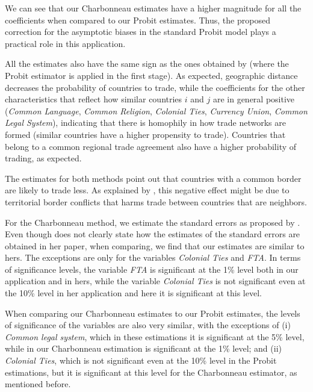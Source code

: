 We can see that our Charbonneau estimates have a higher magnitude for all the coefficients when compared to our Probit estimates. Thus, the proposed correction for the asymptotic biases in the standard Probit model plays a practical role in this application.

All the estimates also have the same sign as the ones obtained by \cite{helpman2008estimating} (where the Probit estimator is applied in the first stage). As expected, geographic distance decreases the probability of countries to trade, while the coefficients for the other characteristics that reflect how similar countries $i$ and $j$ are in general positive (\textit{Common Language}, \textit{Common Religion}, \textit{Colonial Ties}, \textit{Currency Union}, \textit{Common Legal System}), indicating that there is homophily in how trade networks are formed (similar countries have a higher propensity to trade). Countries that belong to a common regional trade agreement also have a higher probability of trading, as expected.

The estimates for both methods point out that countries with a common border are likely to trade less. As explained by \cite{helpman2008estimating}, this negative effect might be due to territorial border conflicts that harms trade between countries that are neighbors.

For the Charbonneau method, we estimate the standard errors as proposed by \cite{jochmans2018semiparametric}. Even though \cite{charbonneau2017multiple} does not clearly state how the estimates of the standard errors are obtained in her paper, when comparing, we find that our estimates are similar to hers. The exceptions are only for the variables \textit{Colonial Ties} and \textit{FTA}. In terms of significance levels, the variable \textit{FTA} is significant at the 1\% level both in our application and in hers, while the variable \textit{Colonial Ties} is not significant even at the 10\% level in her application and here it is significant at this level.

When comparing our Charbonneau estimates to our Probit estimates, the levels of significance of the variables are also very similar, with the exceptions of (i) \textit{Common legal system}, which in these estimations it is significant at the 5\% level, while in our Charbonneau estimation is significant at the 1\% level; and (ii) \textit{Colonial Ties}, which is not significant even at the 10\% level in the Probit estimations, but it is significant at this level for the Charbonneau estimator, as mentioned before.

